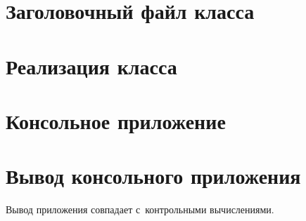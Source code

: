 \documentclass[a4paper,14pt]{extreport}
\begin{document}
\chapter*{Заголовочный файл класса}
	\label{chapter:header}
	

\chapter*{Реализация класса}
	\label{chapter:cpp}
	

\chapter*{Консольное приложение}
	\label{chapter:main}
	

\chapter*{Вывод консольного приложения}
	\label{chapter:output}
	
	Вывод приложения совпадает с контрольными вычислениями.
\end{document}
